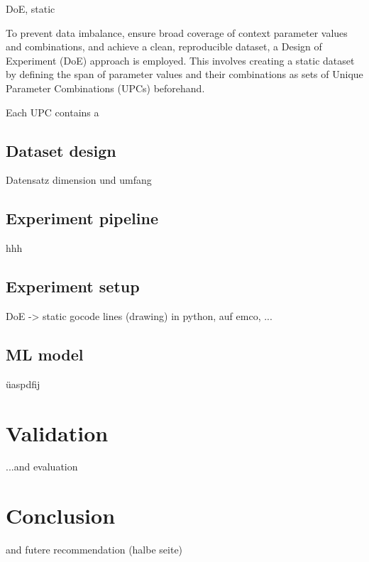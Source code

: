 \documentclass[5p,times,procedia]{elsarticle}
\newenvironment{note}{%
	\noindent
    \color{notecolor}%
}{%
    \par\medskip%
}
\begin{document}
DoE, static

To prevent data imbalance, ensure broad coverage of context parameter values and combinations, and achieve a clean, reproducible dataset, a Design of Experiment (DoE) approach is employed. This involves creating a static dataset by defining the span of parameter values and their combinations as sets of Unique Parameter Combinations (UPCs) beforehand.


Each UPC contains a

 







\subsection{Dataset design}
\vspace*{-\baselineskip}
Datensatz dimension und umfang

\subsection{Experiment pipeline}
\vspace*{-\baselineskip}
hhh

\subsection{Experiment setup}
\vspace*{-\baselineskip}
DoE -> static gocode lines (drawing) 
in python, auf emco, ...


\subsection{ML model}
\vspace*{-\baselineskip}
üaspdfij

 
\section{Validation}
\begin{note}
	...and evaluation

\end{note}
\section{Conclusion}
\begin{note}
	and futere recommendation (halbe seite)
	
\end{note}





\end{document}
